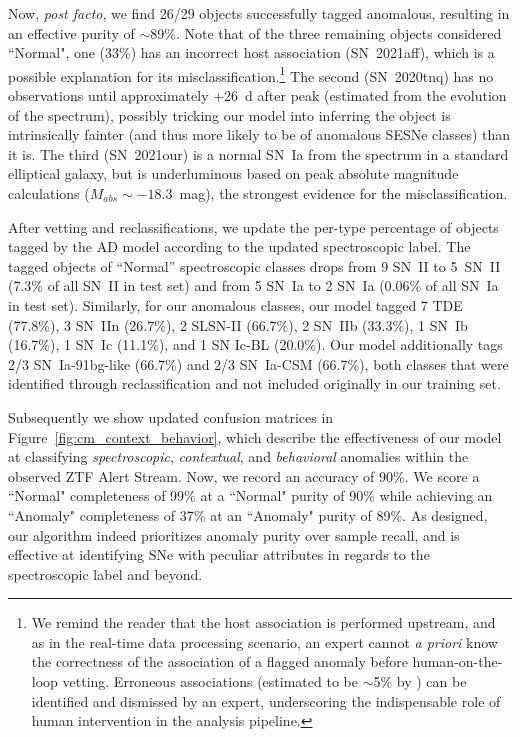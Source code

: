 \documentclass[twocolumn]{aastex63}
\begin{document}
Now, \textit{post facto}, we find 26/29 objects successfully tagged anomalous, resulting in an effective purity of $\sim$89\%. Note that of the three remaining objects considered ``Normal", one (33\%) has an incorrect host association (SN~2021aff), which is a possible explanation for its misclassification.\footnote{We remind the reader that the host association is performed upstream, and as in the real-time data processing scenario, an expert cannot \textit{a priori} know the correctness of the association of a flagged anomaly before human-on-the-loop vetting. Erroneous associations (estimated to be $\sim$5\% by \citealt{Gagliano2021}) can be identified and dismissed by an expert, underscoring the indispensable role of human intervention in the analysis pipeline.} The second (SN~2020tnq) has no observations until approximately +26~d after peak (estimated from the evolution of the spectrum), possibly tricking our model into inferring the object is intrinsically fainter (and thus more likely to be of anomalous SESNe classes) than it is. The third (SN~2021our) is a normal SN~Ia from the spectrum in a standard elliptical galaxy, but is underluminous based on peak absolute magnitude calculations ($M_{abs}\sim-18.3$~mag), the strongest evidence for the misclassification. \par

After vetting and reclassifications, we update the per-type percentage of objects tagged by the AD model according to the updated spectroscopic label. The tagged objects of ``Normal'' spectroscopic classes drops from 9 SN~II to 5~SN~II (7.3\% of all SN~II in test set) and from 5 SN~Ia to 2 SN~Ia (0.06\% of all SN~Ia in test set). Similarly, for our anomalous classes, our model tagged 7 TDE (77.8\%), 3 SN~IIn (26.7\%), 2 SLSN-II (66.7\%), 2 SN~IIb (33.3\%), 1 SN~Ib (16.7\%), 1 SN~Ic (11.1\%), and 1 SN Ic-BL (20.0\%). Our model additionally tags 2/3 SN~Ia-91bg-like (66.7\%) and 2/3 SN~Ia-CSM (66.7\%), both classes that were identified through reclassification and not included originally in our training set. \par

Subsequently we show updated confusion matrices in Figure~\ref{fig:cm_context_behavior}, which describe the effectiveness of our model at classifying \emph{spectroscopic}, \emph{contextual}, and \emph{behavioral} anomalies within the observed ZTF Alert Stream. Now, we record an accuracy of 90\%. We score a ``Normal" completeness of 99\% at a ``Normal" purity of 90\% while achieving an ``Anomaly" completeness of 37\% at an ``Anomaly" purity of 89\%. As designed, our algorithm indeed prioritizes anomaly purity over sample recall, and is effective at identifying SNe with peculiar attributes in regards to the spectroscopic label and beyond. \par
\end{document}

